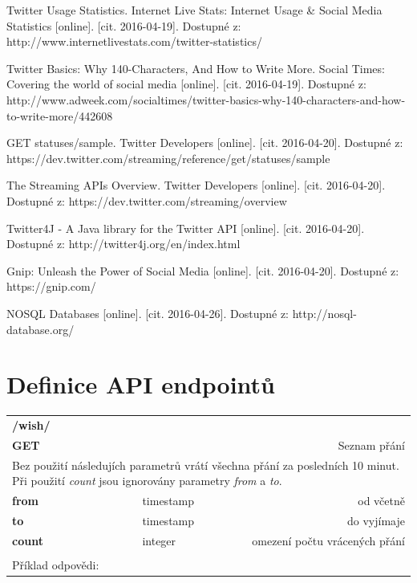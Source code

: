 \documentclass[thesis=B,czech]{FITthesis}[2012/06/26]
\begin{document}
\begin{thebibliography}{1}
Twitter Usage Statistics. Internet Live Stats: Internet Usage \& Social Media Statistics [online]. [cit. 2016-04-19]. Dostupné z: http://www.internetlivestats.com/twitter-statistics/

Twitter Basics: Why 140-Characters, And How to Write More. Social Times: Covering the world of social media [online]. [cit. 2016-04-19]. Dostupné z: http://www.adweek.com/socialtimes/twitter-basics-why-140-characters-and-how-to-write-more/442608

GET statuses/sample. Twitter Developers [online]. [cit. 2016-04-20]. Dostupné z: https://dev.twitter.com/streaming/reference/get/statuses/sample

The Streaming APIs Overview. Twitter Developers [online]. [cit. 2016-04-20]. Dostupné z: https://dev.twitter.com/streaming/overview

Twitter4J - A Java library for the Twitter API [online]. [cit. 2016-04-20]. Dostupné z: http://twitter4j.org/en/index.html

Gnip: Unleash the Power of Social Media [online]. [cit. 2016-04-20]. Dostupné z: https://gnip.com/

NOSQL Databases [online]. [cit. 2016-04-26]. Dostupné z: http://nosql-database.org/

  
\end{thebibliography}



\appendix

\chapter{Definice API endpointů}
\label{appendix-api}
\begin{table}[h]
\begin{tabular}{llllr}
\rowcolor[HTML]{EFEFEF}
\large \textbf{/wish/}        &         &                 &        & \multicolumn{1}{l}{}                \\
\rowcolor[HTML]{EFEFEF}
\textbf{GET}          &         &                 &        & Seznam přání                        \\
\multicolumn{5}{l}{\parbox[t]{12.8cm}{Bez použití následujích parametrů vrátí všechna přání za posledních 10 minut. Při použití \textit{count} jsou ignorovány parametry  \textit{from} a \textit{to}.}  } \\
\textbf{from}         &         & timestamp       &        & od včetně                           \\
\textbf{to}           &         & timestamp       &        & do vyjímaje                         \\
\textbf{count}        &         & integer         &        & omezení počtu vrácených přání      \\
 & & & & \\
 Příklad odpovědi:
\end{tabular}
\end{table}
\end{document}
